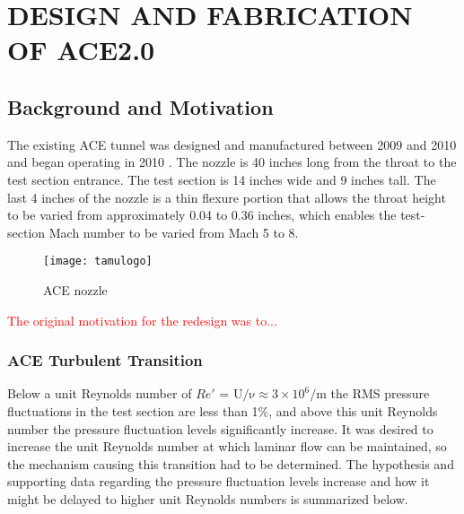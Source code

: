 %
%  
%



\chapter{DESIGN AND FABRICATION OF ACE2.0}

\section{Background and Motivation}

The existing ACE tunnel was designed and manufactured between 2009 and 2010 and began operating in 2010 \cite{ace09,ace10-calibrate,tichenor-dis}. The nozzle is 40 inches long from the throat to the test section entrance. The test section is 14 inches wide and 9 inches tall. The last 4 inches of the nozzle is a thin flexure portion that allows the throat height to be varied from approximately 0.04 to 0.36 inches, which enables the test-section Mach number to be varied from Mach 5 to 8.

\begin{figure}[ht]
    \centering
    \texttt{[image: tamulogo]}
    \caption{ACE nozzle}
    \label{fig:ace-nozzle}
\end{figure}

\textcolor{red}{The original motivation for the redesign was to...}

\subsection{ACE Turbulent Transition}

Below a unit Reynolds number of $Re'$ = $\mathrm{U/\nu \approx 3 \times 10^6/\mathrm{m}}$ the RMS pressure fluctuations in the test section are less than 1\%, and above this unit Reynolds number the pressure fluctuation levels significantly increase. It was desired to increase the unit Reynolds number at which laminar flow can be maintained, so the mechanism causing this transition had to be determined. The hypothesis and supporting data regarding the pressure fluctuation levels increase and how it might be delayed to higher unit Reynolds numbers is summarized below.

